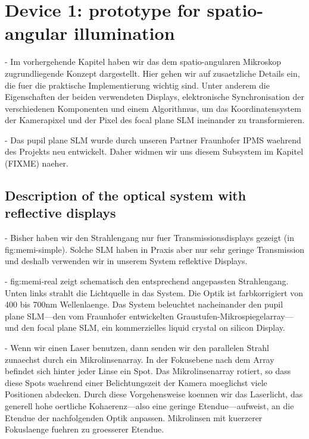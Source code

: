 \chapter{Device 1: prototype for spatio-angular illumination}
\begin{summary}
   - Im vorhergehende Kapitel haben wir das dem spatio-angularen
     Mikroskop zugrundliegende Konzept dargestellt. Hier gehen wir auf
     zusaetzliche Details ein, die fuer die praktische Implementierung
     wichtig sind. Unter anderem die Eigenschaften der beiden
     verwendeten Displays, elektronische Synchronisation der
     verschiedenen Komponenten und einem Algorithmus, um das
     Koordinatensystem der Kamerapixel und der Pixel des focal plane
     SLM ineinander zu transformieren.

   - Das pupil plane SLM wurde durch unseren Partner Fraunhofer IPMS
     waehrend des Projekts neu entwickelt.  Daher widmen wir uns diesem
     Subsystem im Kapitel (FIXME) naeher.
\end{summary}
\section{Description of the optical system with reflective displays}
 - Bisher haben wir den Strahlengang nur fuer Transmissionsdisplays
   gezeigt (in fig:memi-simple). Solche SLM haben in Praxis aber nur
   sehr geringe Transmission und deshalb verwenden wir in unserem
   System reflektive Displays. 

 - fig:memi-real zeigt schematisch den entsprechend angepassten
   Strahlengang.  Unten links strahlt die Lichtquelle in das
   System. Die Optik ist farbkorrigiert von 400 bis 700nm
   Wellenlaenge. Das System beleuchtet nacheinander den pupil plane
   SLM---den vom Fraunhofer entwickelten
   Graustufen-Mikrospiegelarray---und den focal plane SLM, ein
   kommerzielles liquid crystal on silicon Display.
  
 - Wenn wir einen Laser benutzen, dann senden wir den parallelen
   Strahl zunaechst durch ein Mikrolinsenarray. In der Fokusebene nach
   dem Array befindet sich hinter jeder Linse ein Spot. Das
   Mikrolinsenarray rotiert, so dass diese Spots waehrend einer
   Belichtungszeit der Kamera moeglichst viele Positionen abdecken.
   Durch diese Vorgehensweise koennen wir das Laserlicht, das generell
   hohe oertliche Kohaerenz---also eine geringe Etendue---aufweist, an
   die Etendue der nachfolgenden Optik anpassen. Mikrolinsen mit
   kuerzerer Fokuslaenge fuehren zu groesserer Etendue.

